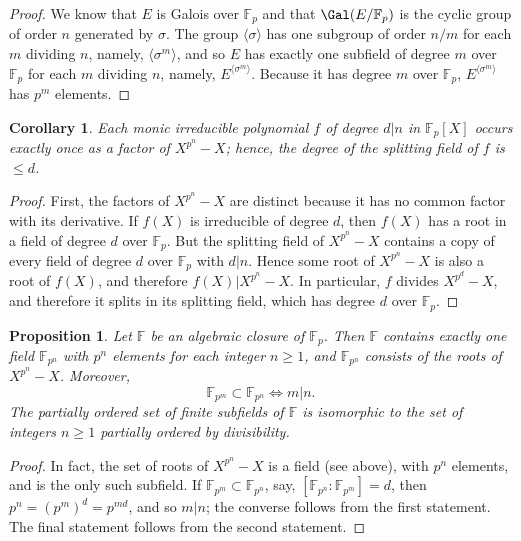 \documentclass[a4paper,11pt,final,openany]{memoir}
\newtheorem{corollary}[X]{Corollary}
\newtheorem{proposition}[X]{Proposition}
\theoremstyle{nonumberplain}
\newtheorem{proof}{Proof.}
\begin{document}
\begin{proof}
We know that $E$ is Galois over $\mathbb{F}_{p}$ and that $\Gal(E/\mathbb{F}%
_{p})$ is the cyclic group of order $n$ generated by $\sigma$. The group
$\langle{}\sigma\rangle$ has one subgroup of order $n/m$ for each $m$ dividing
$n$, namely, $\langle{}\sigma^{m}\rangle$, and so $E$ has exactly one subfield
of degree $m$ over $\mathbb{F}{}_{p}$ for each $m$ dividing $n$, namely,
$E^{\langle\sigma^{m}\rangle}$. Because it has degree $m$ over $\mathbb{F}%
{}_{p}$, $E^{\langle\sigma^{m}\rangle}$ has $p^{m}$ elements.
\end{proof}

\begin{corollary}
\label{cg18}Each monic irreducible polynomial $f$ of degree $d|n$ in
$\mathbb{F}_{p}[X]$ occurs exactly once as a factor of $X^{p^{n}}-X$; hence,
the degree of the splitting field of $f$ is $\leq d$.
\end{corollary}

\begin{proof}
First, the factors of $X^{p^{n}}-X$ are distinct because it has no common
factor with its derivative. If $f(X)$ is irreducible of degree $d$, then
$f(X)$ has a root in a field of degree $d$ over $\mathbb{F}_{p}$. But the
splitting field of $X^{p^{n}}-X$ contains a copy of every field of degree $d$
over $\mathbb{F}_{p}$ with $d|n$. Hence some root of $X^{p^{n}}-X$ is also a
root of $f(X)$, and therefore $f(X)|X^{p^{n}}-X$. In particular, $f$ divides
$X^{p^{d}}-X$, and therefore it splits in its splitting field, which has
degree $d$ over $\mathbb{F}{}_{p}$.
\end{proof}

\begin{proposition}
\label{cg18m}Let $\mathbb{F}$ be an algebraic closure of $\mathbb{F}_{p}$.
Then $\mathbb{F}$ contains exactly one field $\mathbb{F}_{p^{n}}$ with $p^{n}$
elements for each integer $n\geq1$, and $\mathbb{F}{}_{p^{n}}$ consists of the
roots of $X^{p^{n}}-X$. Moreover,
\[
\mathbb{F}_{p^{m}}\subset\mathbb{F}_{p^{n}}\iff m|n.
\]
The partially ordered set of finite subfields of $\mathbb{F}$ is isomorphic to
the set of integers $n\geq1$ partially ordered by divisibility.
\end{proposition}

\begin{proof}
In fact, the set of roots of $X^{p^{n}}-X$ is a field (see above), with
$p^{n}$ elements, and is the only such subfield. If $\mathbb{F}_{p^{m}}%
\subset\mathbb{F}_{p^{n}}$, say, $[\mathbb{F}{}_{p^{n}}\colon\mathbb{F}%
{}_{p^{m}}]=d$, then $p^{n}=(p^{m})^{d}=p^{md}$, and so $m|n$; the converse
follows from the first statement. The final statement follows from the second statement.
\end{proof}
\end{document}
